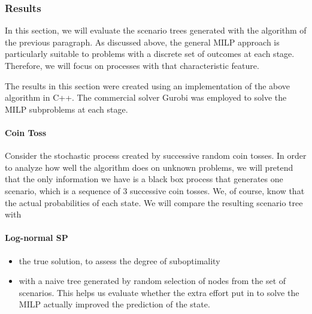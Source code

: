 \subsubsection{Results}
In this section, we will evaluate the scenario trees generated with the algorithm of the previous paragraph. As discussed above, the general MILP approach is particularly suitable to problems with a discrete set of outcomes at each stage. Therefore, we will focus on processes with that characteristic feature.

The results in this section were created using an implementation of the above algorithm in C++. The commercial solver Gurobi was employed to solve the MILP subproblems at each stage.  

\paragraph{Coin Toss} Consider the stochastic process created by successive random coin tosses. In order to analyze how well the algorithm does on unknown problems, we will pretend that the only information we have is a black box process that generates one scenario, which is a sequence of 3 successive coin tosses. We, of course, know that the actual probabilities of each state. We will compare the resulting scenario tree with
\paragraph{Log-normal SP}
\begin{itemize}
\item the true solution, to assess the degree of suboptimality
\item with a naive tree generated by random selection of nodes from the set of scenarios. This helps us evaluate whether the extra effort put in to solve the MILP actually improved the prediction of the state.
\end{itemize}
